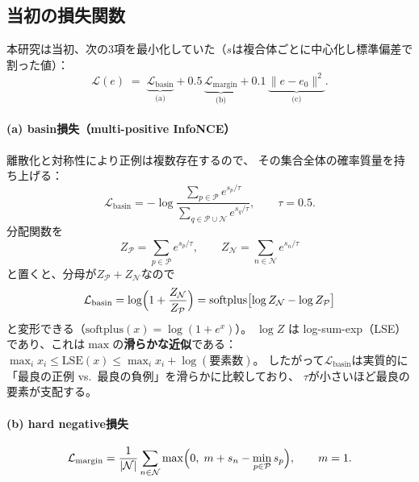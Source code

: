 \documentclass[11pt,a4paper]{article}
\begin{document}
\subsection{当初の損失関数}

本研究は当初、次の3項を最小化していた（$s$は複合体ごとに中心化し標準偏差で割った値）：
\begin{equation}
  \mathcal{L}(e) \;=\;
  \underbrace{\mathcal{L}_{\mathrm{basin}}}_{\text{(a)}}
  + 0.5\,\underbrace{\mathcal{L}_{\mathrm{margin}}}_{\text{(b)}}
  + 0.1\,\underbrace{\|e - e_0\|^2}_{\text{(c)}} .
  \label{eq:oldloss}
\end{equation}

\paragraph{(a) basin損失（multi-positive InfoNCE）}
離散化と対称性により正例は複数存在するので、
その集合全体の確率質量を持ち上げる：
\begin{equation}
  \mathcal{L}_{\mathrm{basin}}
  = -\log \frac{\sum_{p \in \mathcal{P}} e^{s_p/\tau}}{\sum_{q \in \mathcal{P}\cup\mathcal{N}} e^{s_q/\tau}},
  \qquad \tau = 0.5 .
\end{equation}
分配関数を
\begin{equation}
  Z_{\mathcal{P}} = \sum_{p \in \mathcal{P}} e^{s_p/\tau}, \qquad
  Z_{\mathcal{N}} = \sum_{n \in \mathcal{N}} e^{s_n/\tau}
\end{equation}
と置くと、分母が$Z_{\mathcal{P}} + Z_{\mathcal{N}}$なので
\begin{equation}
  \mathcal{L}_{\mathrm{basin}}
  = \log\Bigl(1 + \frac{Z_{\mathcal{N}}}{Z_{\mathcal{P}}}\Bigr)
  = \mathrm{softplus}\bigl[\log Z_{\mathcal{N}} - \log Z_{\mathcal{P}}\bigr]
\end{equation}
と変形できる（$\mathrm{softplus}(x) = \log(1+e^x)$）。
$\log Z$ は log-sum-exp（LSE）であり、これは$\max$の\textbf{滑らかな近似}である：
$\max_i x_i \le \mathrm{LSE}(x) \le \max_i x_i + \log(\text{要素数})$。
したがって$\mathcal{L}_{\mathrm{basin}}$は実質的に
「最良の正例 vs.\ 最良の負例」を滑らかに比較しており、
$\tau$が小さいほど最良の要素が支配する。

\paragraph{(b) hard negative損失}
\begin{equation}
  \mathcal{L}_{\mathrm{margin}}
  = \frac{1}{|\mathcal{N}|}\sum_{n \in \mathcal{N}}
    \max\Bigl(0,\; m + s_n - \min_{p \in \mathcal{P}} s_p\Bigr), \qquad m = 1 .
  \label{eq:minanchor}
\end{equation}
\end{document}
